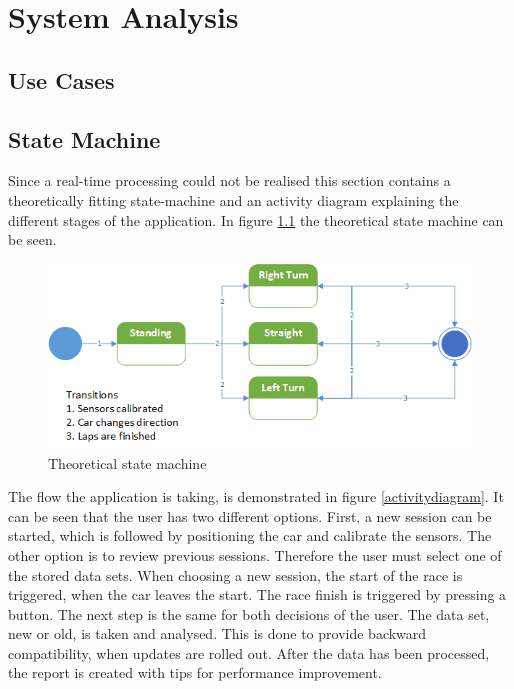 \chapter{System Analysis}

\section{Use Cases}

\section{State Machine}
Since a real-time processing could not be realised this section contains a theoretically fitting state-machine and an activity diagram explaining the different stages of the application. In figure \ref{statemachine} the theoretical state machine can be seen.

\begin{figure}[H]
	\centering
	\includegraphics[scale=0.8]{Pictures/statemachine.png}
	\caption{Theoretical state machine}
	\label{statemachine}
\end{figure}

The flow the application is taking, is demonstrated in figure \ref{activitydiagram}. It can be seen that the user has two different options. First, a new session can be started, which is followed by positioning the car and calibrate the sensors. The other option is to review previous sessions. Therefore the user must select one of the stored data sets. When choosing a new session, the start of the race is triggered, when the car leaves the start. The race finish is triggered by pressing a button. The next step is the same for both decisions of the user. The data set, new or old, is taken and analysed. This is done to provide backward compatibility, when updates are rolled out. After the data has been processed, the report is created with tips for performance improvement.

